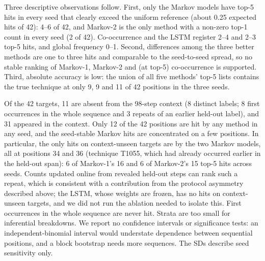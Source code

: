 \documentclass[conference]{IEEEtran}
\begin{document}
Three descriptive observations follow. First, only the Markov models have top-5 hits in every seed that clearly exceed the uniform reference (about 0.25 expected hits of 42): 4--6 of 42, and Markov-2 is the only method with a non-zero top-1 count in every seed (2 of 42). Co-occurrence and the LSTM register 2--4 and 2--3 top-5 hits, and global frequency 0--1. Second, differences among the three better methods are one to three hits and comparable to the seed-to-seed spread, so no stable ranking of Markov-1, Markov-2 and (at top-5) co-occurrence is supported. Third, absolute accuracy is low: the union of all five methods' top-5 lists contains the true technique at only 9, 9 and 11 of 42 positions in the three seeds.

Of the 42 targets, 11 are absent from the 98-step context (8 distinct labels; 8 first occurrences in the whole sequence and 3 repeats of an earlier held-out label), and 31 appeared in the context. Only 12 of the 42 positions are hit by any method in any seed, and the seed-stable Markov hits are concentrated on a few positions. In particular, the only hits on context-unseen targets are by the two Markov models, all at positions 34 and 36 (technique T1055, which had already occurred earlier in the held-out span): 6 of Markov-1's 16 and 6 of Markov-2's 15 top-5 hits across seeds. Counts updated online from revealed held-out steps can rank such a repeat, which is consistent with a contribution from the protocol asymmetry described above; the LSTM, whose weights are frozen, has no hits on context-unseen targets, and we did not run the ablation needed to isolate this. First occurrences in the whole sequence are never hit. Strata are too small for inferential breakdowns. We report no confidence intervals or significance tests: an independent-binomial interval would understate dependence between sequential positions, and a block bootstrap needs more sequences. The SDs describe seed sensitivity only.
\end{document}
